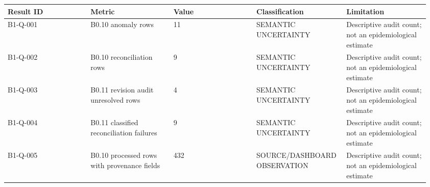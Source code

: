 \begingroup\footnotesize\setlength{\tabcolsep}{3pt}\renewcommand{\arraystretch}{1.15}
\begin{longtable}{P{0.1920\linewidth}P{0.1920\linewidth}P{0.1920\linewidth}P{0.1920\linewidth}P{0.1920\linewidth}}
\toprule
Result ID & Metric & Value & Classification & Limitation \\
\midrule\endhead
B1-Q-001 & B0.10 anomaly rows & 11 & SEMANTIC UNCERTAINTY & Descriptive audit count; not an epidemiological estimate \\
B1-Q-002 & B0.10 reconciliation rows & 9 & SEMANTIC UNCERTAINTY & Descriptive audit count; not an epidemiological estimate \\
B1-Q-003 & B0.11 revision audit unresolved rows & 4 & SEMANTIC UNCERTAINTY & Descriptive audit count; not an epidemiological estimate \\
B1-Q-004 & B0.11 classified reconciliation failures & 9 & SEMANTIC UNCERTAINTY & Descriptive audit count; not an epidemiological estimate \\
B1-Q-005 & B0.10 processed rows with provenance fields & 432 & SOURCE/DASHBOARD OBSERVATION & Descriptive audit count; not an epidemiological estimate \\
\bottomrule
\end{longtable}
\endgroup
